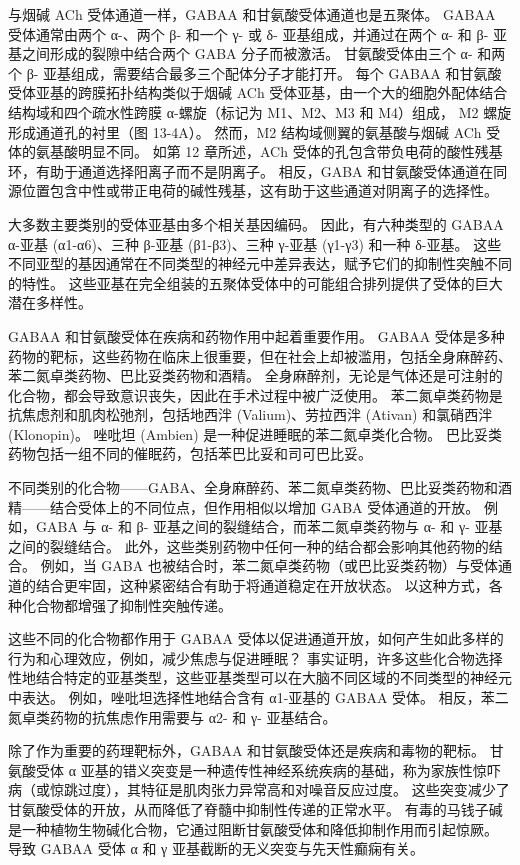 与烟碱 ACh 受体通道一样，GABAA 和甘氨酸受体通道也是五聚体。 GABAA 受体通常由两个 α-、两个 β- 和一个 γ- 或 δ- 亚基组成，并通过在两个 α- 和 β- 亚基之间形成的裂隙中结合两个 GABA 分子而被激活。 甘氨酸受体由三个 α- 和两个 β- 亚基组成，需要结合最多三个配体分子才能打开。 每个 GABAA 和甘氨酸受体亚基的跨膜拓扑结构类似于烟碱 ACh 受体亚基，由一个大的细胞外配体结合结构域和四个疏水性跨膜 α-螺旋（标记为 M1、M2、M3 和 M4）组成， M2 螺旋形成通道孔的衬里（图 13-4A）。 然而，M2 结构域侧翼的氨基酸与烟碱 ACh 受体的氨基酸明显不同。 如第 12 章所述，ACh 受体的孔包含带负电荷的酸性残基环，有助于通道选择阳离子而不是阴离子。 相反，GABA 和甘氨酸受体通道在同源位置包含中性或带正电荷的碱性残基，这有助于这些通道对阴离子的选择性。

大多数主要类别的受体亚基由多个相关基因编码。 因此，有六种类型的 GABAA α-亚基 (α1-α6)、三种 β-亚基 (β1-β3)、三种 γ-亚基 (γ1-γ3) 和一种 δ-亚基。 这些不同亚型的基因通常在不同类型的神经元中差异表达，赋予它们的抑制性突触不同的特性。 这些亚基在完全组装的五聚体受体中的可能组合排列提供了受体的巨大潜在多样性。

GABAA 和甘氨酸受体在疾病和药物作用中起着重要作用。 GABAA 受体是多种药物的靶标，这些药物在临床上很重要，但在社会上却被滥用，包括全身麻醉药、苯二氮卓类药物、巴比妥类药物和酒精。 全身麻醉剂，无论是气体还是可注射的化合物，都会导致意识丧失，因此在手术过程中被广泛使用。 苯二氮卓类药物是抗焦虑剂和肌肉松弛剂，包括地西泮 (Valium)、劳拉西泮 (Ativan) 和氯硝西泮 (Klonopin)。 唑吡坦 (Ambien) 是一种促进睡眠的苯二氮卓类化合物。 巴比妥类药物包括一组不同的催眠药，包括苯巴比妥和司可巴比妥。

不同类别的化合物——GABA、全身麻醉药、苯二氮卓类药物、巴比妥类药物和酒精——结合受体上的不同位点，但作用相似以增加 GABA 受体通道的开放。 例如，GABA 与 α- 和 β- 亚基之间的裂缝结合，而苯二氮卓类药物与 α- 和 γ- 亚基之间的裂缝结合。 此外，这些类别药物中任何一种的结合都会影响其他药物的结合。 例如，当 GABA 也被结合时，苯二氮卓类药物（或巴比妥类药物）与受体通道的结合更牢固，这种紧密结合有助于将通道稳定在开放状态。 以这种方式，各种化合物都增强了抑制性突触传递。

这些不同的化合物都作用于 GABAA 受体以促进通道开放，如何产生如此多样的行为和心理效应，例如，减少焦虑与促进睡眠？ 事实证明，许多这些化合物选择性地结合特定的亚基类型，这些亚基类型可以在大脑不同区域的不同类型的神经元中表达。 例如，唑吡坦选择性地结合含有 α1-亚基的 GABAA 受体。 相反，苯二氮卓类药物的抗焦虑作用需要与 α2- 和 γ- 亚基结合。

除了作为重要的药理靶标外，GABAA 和甘氨酸受体还是疾病和毒物的靶标。 甘氨酸受体 α 亚基的错义突变是一种遗传性神经系统疾病的基础，称为家族性惊吓病（或惊跳过度），其特征是肌肉张力异常高和对噪音反应过度。 这些突变减少了甘氨酸受体的开放，从而降低了脊髓中抑制性传递的正常水平。 有毒的马钱子碱是一种植物生物碱化合物，它通过阻断甘氨酸受体和降低抑制作用而引起惊厥。 导致 GABAA 受体 α 和 γ 亚基截断的无义突变与先天性癫痫有关。

